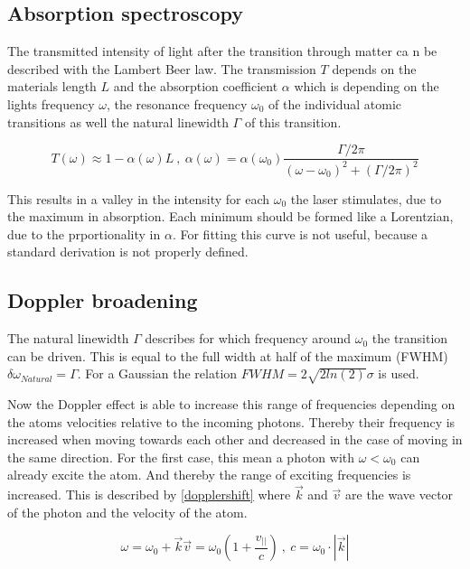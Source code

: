 \documentclass[]{article}
\begin{document}
\subsection{Absorption spectroscopy}
The transmitted intensity of light after the transition through matter ca n be described with the Lambert Beer law. The transmission $T$ depends on the materials length $L$ and the absorption coefficient $\alpha$ which is depending on the lights frequency $\omega$, the resonance frequency $\omega_0$ of the individual atomic transitions as well the natural linewidth $\Gamma$ of this transition.

\begin{equation}
T(\omega)\approx 1-\alpha(\omega)L \:,\: \alpha(\omega)= \alpha(\omega_0)\frac{\Gamma/2\pi}{(\omega-\omega_0)^2 + (\Gamma/2\pi)^2}
\end{equation}

This results in a valley in the intensity for each $\omega_0$ the laser stimulates, due to the maximum in absorption. Each minimum should be formed like a Lorentzian, due to the prportionality in $\alpha$. For fitting this curve is not useful, because a standard derivation is not properly defined. 

\subsection{Doppler broadening}
The natural linewidth $\Gamma$ describes for which frequency around $\omega_0$ the transition can be driven. This is equal to the full width at half of the maximum (FWHM) $\delta\omega_{Natural} = \Gamma$. For a Gaussian the relation $FWHM = 2 \sqrt{2ln(2)} \sigma$ is used.

Now the Doppler effect is able to increase this range of frequencies depending on the atoms velocities relative to the incoming photons. Thereby their frequency is increased when moving towards each other and decreased in the case of moving in the same direction. For the first case, this mean a photon with $\omega < \omega_0$ can already excite the atom. And thereby the range of exciting frequencies is increased. This is described by \autoref{dopplershift} where $\vec{k}$ and $\vec{v}$ are the wave vector of the photon and the velocity of the atom.

\begin{equation}
\omega  = \omega_0 + \vec{k}\vec{v} = \omega_0 \left(1+\frac{v_{||}}{c} \right)\:,\: c = \omega_0\cdot |\vec{k}|
\label{eq:dopplershift}
\end{equation}
\end{document}
